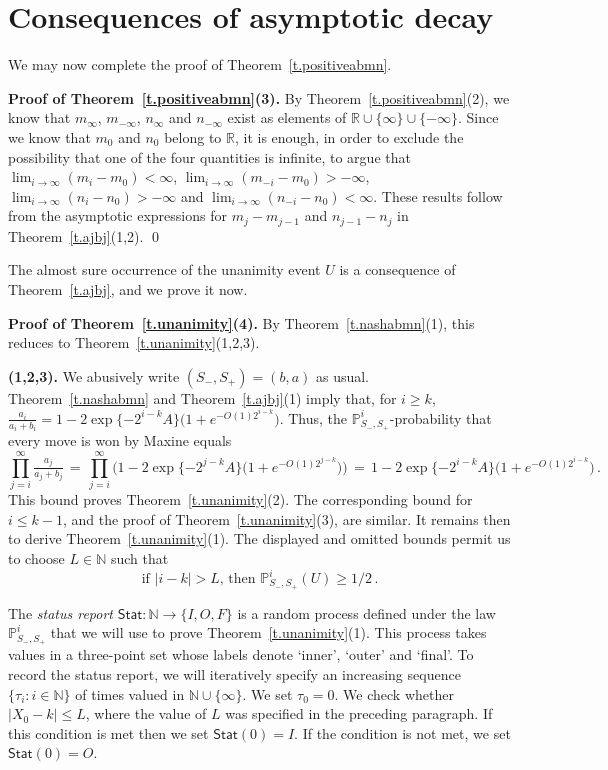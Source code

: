 \documentclass[letterpaper,11pt,oneside,reqno]{amsbook}
\newcommand{\PP}{\ensuremath{\mathbb{P}}}
\newcommand{\N}{\ensuremath{\mathbb{N}}}
\newcommand{\R}{\ensuremath{\mathbb{R}}}
\numberwithin{figure}{chapter}
\theoremstyle{definition}
\theoremstyle{definition}
\theoremstyle{definition}
\theoremstyle{definition}
\theoremstyle{definition}
\newcommand{\nwithzero}{\N}
\newcommand{\status}{\mathsf{Stat}}
\begin{document}
  \section{Consequences of asymptotic decay}\label{s.consequences}


 We may now complete the proof of Theorem~\ref{t.positiveabmn}.
 
{\bf Proof of Theorem~\ref{t.positiveabmn}(3).}
By Theorem~\ref{t.positiveabmn}(2), we know that $m_\infty$, $m_{-\infty}$, $n_\infty$ and $n_{-\infty}$ exist as elements of $\R \cup \{ \infty \} \cup \{ - \infty \}$. Since we know that $m_0$ and $n_0$
belong to $\R$, it is enough, in order to exclude the possibility that one of the four quantities is infinite, to argue that
$\lim_{i \to \infty} (m_i - m_0) < \infty$, $\lim_{i \to \infty} (m_{-i} - m_0) > -  \infty$,  $\lim_{i \to \infty} (n_i - n_0) > - \infty$ and  $\lim_{i \to \infty} (n_{-i} - n_0) <  \infty$. 
 These results follow from the asymptotic expressions for $m_j - m_{j-1}$ and $n_{j-1} - n_j$ in Theorem~\ref{t.ajbj}(1,2). \qed
 
 The almost sure occurrence of the unanimity event $U$ is a consequence of Theorem~\ref{t.ajbj}, and we prove it now.
  
 {\bf Proof of Theorem~\ref{t.unanimity}(4).}
 By Theorem~\ref{t.nashabmn}(1), this reduces to Theorem~\ref{t.unanimity}(1,2,3).
 
{\bf (1,2,3).}  We abusively write $(S_-,S_+)= (b,a)$ as usual. Theorem~\ref{t.nashabmn} and Theorem~\ref{t.ajbj}(1)
 imply that, for $i \geq k$, $\tfrac{a_i}{a_i + b_i} 
 = 1 -  2\exp \{ - 2^{i-k}A \}  \big( 1 + e^{-O(1) 2^{i-k}}\big)$.
 Thus, the $\PP_{S_-,S_+}^i$-probability that every move is won by Maxine equals
 $$
  \prod_{j=i}^\infty \tfrac{a_j}{a_j + b_j} \, = \, \prod_{j=i}^\infty \Big( 1 -  2\exp \{ - 2^{j-k}A \}  \big( 1 + e^{-O(1) 2^{j-k}}\big) \Big) \, = \, 1 -  2\exp \{ - 2^{i-k}A \}  \big( 1 + e^{-O(1) 2^{i-k}}\big) \, .
 $$
 This bound proves Theorem~\ref{t.unanimity}(2). The corresponding bound for $i \leq k-1$, and the proof of Theorem~\ref{t.unanimity}(3), are similar. 
 It remains then to derive Theorem~\ref{t.unanimity}(1).
 The displayed and omitted bounds permit us to choose 
 $L \in \N$ such that
 \begin{equation}\label{e.outer}
 \textrm{if $\vert i - k \vert > L$, then $\PP_{S_-,S_+}^ i(U) \geq 1/2$} \, .
 \end{equation}
 
 
 The {\em status report} $\status:\N \to \{ I,O,F\}$ is a random process defined under the law  $\PP_{S_-,S_+}^i$ that we will use to prove Theorem~\ref{t.unanimity}(1). This process takes values in a three-point set whose labels denote `inner', `outer' and `final'. 
 To record the status report, 
 we will iteratively specify an increasing sequence $\big\{ \tau_i: i \in \N \big\}$ of times valued in $\nwithzero \cup \{ \infty \}$.
 We set $\tau_0 = 0$. We check whether 
 $\vert X_0 - k \vert \leq L$, where the value of $L$ was specified in the preceding paragraph. If this condition is met then we set $\status(0) = I$.
 If the condition is not met, 
 we  set $\status(0) = O$. 
 
\end{document}
